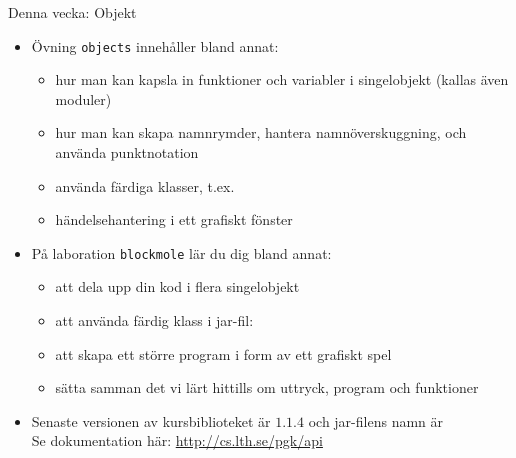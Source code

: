 
\ifkompendium\else
\begin{SlideExtra}{Denna vecka: Objekt}
\begin{itemize}
\item Övning \texttt{objects} innehåller bland annat:
\begin{itemize}
\item hur man kan kapsla in funktioner och variabler i singelobjekt (kallas även moduler)
\item hur man kan skapa namnrymder, hantera namnöverskuggning, och använda punktnotation
\item använda färdiga klasser, t.ex. 
\item händelsehantering i ett grafiskt fönster
\end{itemize}

\item På laboration \texttt{blockmole} lär du dig bland annat:
\begin{itemize}
  \item att dela upp din kod i flera singelobjekt
  \item att använda färdig klass i jar-fil: 
  \item att skapa ett större program i form av ett grafiskt spel
  \item sätta samman det vi lärt hittills om uttryck, program och funktioner
\end{itemize}

\item Senaste versionen av kursbiblioteket  är $1.1.4$ och jar-filens namn är  \\Se dokumentation här: \url{http://cs.lth.se/pgk/api}
\end{itemize}
\end{SlideExtra}
\fi





